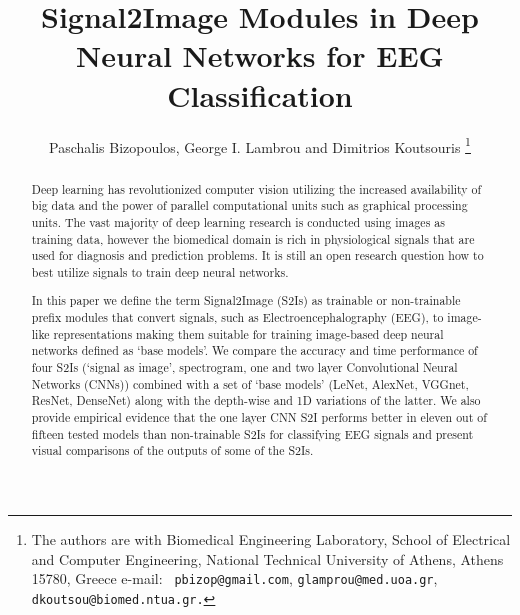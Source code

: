 \documentclass[conference]{IEEEtran}
\begin{document}
\title{Signal2Image Modules in Deep Neural Networks for EEG Classification}
\author{Paschalis Bizopoulos, George I. Lambrou and Dimitrios Koutsouris
  \thanks{The authors are with Biomedical Engineering Laboratory,
    School of Electrical and Computer Engineering, National Technical
    University of Athens, Athens 15780, Greece e-mail: {\tt\small
    pbizop@gmail.com}, {\tt\small glamprou@med.uoa.gr}, {\tt\small
  dkoutsou@biomed.ntua.gr.}}
}

\maketitle

\begin{abstract}
  Deep learning has revolutionized computer vision utilizing the
  increased availability of big data and the power of parallel
  computational units such as graphical processing units.
  The vast majority of deep learning research is conducted using
  images as training data, however the biomedical domain is rich in
  physiological signals that are used for diagnosis and prediction problems.
  It is still an open research question how to best utilize signals
  to train deep neural networks.

  In this paper we define the term Signal2Image (S2Is) as trainable
  or non-trainable prefix modules that convert signals, such as
  Electroencephalography (EEG), to image-like representations making
  them suitable for training image-based deep neural networks defined
  as `base models'.
  We compare the accuracy and time performance of four S2Is (`signal
    as image', spectrogram, one and two layer Convolutional Neural
  Networks (CNNs)) combined with a set of `base models' (LeNet,
  AlexNet, VGGnet, ResNet, DenseNet) along with the depth-wise and 1D
  variations of the latter.
  We also provide empirical evidence that the one layer CNN S2I
  performs better in eleven out of fifteen tested models than
  non-trainable S2Is for classifying EEG signals and present visual
  comparisons of the outputs of some of the S2Is.
\end{abstract}
\end{document}
